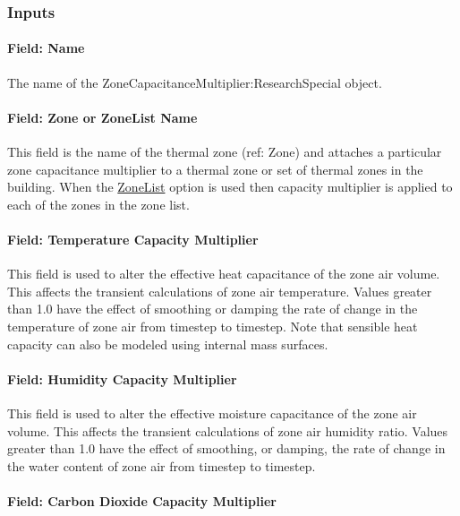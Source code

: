 \subsubsection{Inputs}\label{inputs-14-014}

\paragraph{Field: Name}\label{field-name-hybrid-model}

The name of the ZoneCapacitanceMultiplier:ResearchSpecial object.

\paragraph{Field: Zone or ZoneList Name}\label{field-Zone-or-zonelist-name-hybrid-model}

This field is the name of the thermal zone (ref: Zone) and attaches a particular zone capacitance multiplier to a thermal zone or set of thermal zones in the building. When the \hyperref[zonelist]{ZoneList} option is used then capacity multiplier is applied to each of the zones in the zone list.

\paragraph{Field: Temperature Capacity Multiplier}\label{field-temperature-capacity-multiplier}

This field is used to alter the effective heat capacitance of the zone air volume. This affects the transient calculations of zone air temperature. Values greater than 1.0 have the effect of smoothing or damping the rate of change in the temperature of zone air from timestep to timestep. Note that sensible heat capacity can also be modeled using internal mass surfaces.

\paragraph{Field: Humidity Capacity Multiplier}\label{field-humidity-capacity-multiplier}

This field is used to alter the effective moisture capacitance of the zone air volume. This affects the transient calculations of zone air humidity ratio. Values greater than 1.0 have the effect of smoothing, or damping, the rate of change in the water content of zone air from timestep to timestep.

\paragraph{Field: Carbon Dioxide Capacity Multiplier}\label{field-carbon-dioxide-capacity-multiplier}

